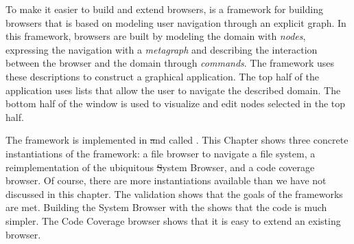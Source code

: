 \documentclass[a4paper,10pt,twoside]{book}
\begin{document}
To make it easier to build and extend browsers, \ob is a framework for building browsers that is based on modeling user navigation through an explicit graph.
In this framework, browsers are built by modeling the domain with \emph{nodes}, expressing the navigation with a \emph{metagraph} and describing the interaction between the browser and the domain through \emph{commands}. 
The framework uses these descriptions to construct a graphical application. The top half of the application uses lists that allow the user to navigate the described domain. The bottom half of the window is used to visualize and edit nodes selected in the top half.

The framework is implemented in \pharo \st and called \ob.
This Chapter shows three concrete instantiations of the framework: a file browser to navigate a file system, a reimplementation of the ubiquitous \st System Browser, and a code coverage browser.
Of course, there are more instantiations available than we have not discussed in this chapter.
The validation shows that the goals of the frameworks are met. Building the System Browser with the \obf shows that the code is much simpler. The Code Coverage browser shows that it is easy to extend an existing browser.








\ifx\wholebook\relax\else
   
   
\end{document}
